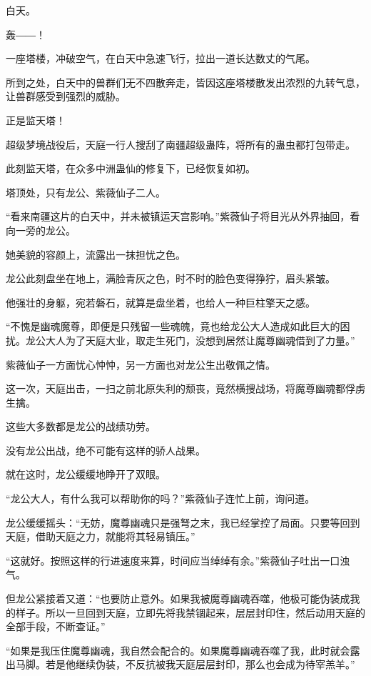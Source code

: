 
\begin{this_body}

白天。

轰――！

一座塔楼，冲破空气，在白天中急速飞行，拉出一道长达数丈的气尾。

所到之处，白天中的兽群们无不四散奔走，皆因这座塔楼散发出浓烈的九转气息，让兽群感受到强烈的威胁。

正是监天塔！

超级梦境战役后，天庭一行人搜刮了南疆超级蛊阵，将所有的蛊虫都打包带走。

此刻监天塔，在众多中洲蛊仙的修复下，已经恢复如初。

塔顶处，只有龙公、紫薇仙子二人。

“看来南疆这片的白天中，并未被镇运天宫影响。”紫薇仙子将目光从外界抽回，看向一旁的龙公。

她美貌的容颜上，流露出一抹担忧之色。

龙公此刻盘坐在地上，满脸青灰之色，时不时的脸色变得狰狞，眉头紧皱。

他强壮的身躯，宛若磐石，就算是盘坐着，也给人一种巨柱擎天之感。

“不愧是幽魂魔尊，即便是只残留一些魂魄，竟也给龙公大人造成如此巨大的困扰。龙公大人为了天庭大业，取走生死门，没想到居然让魔尊幽魂借到了力量。”

紫薇仙子一方面忧心忡忡，另一方面也对龙公生出敬佩之情。

这一次，天庭出击，一扫之前北原失利的颓丧，竟然横搜战场，将魔尊幽魂都俘虏生擒。

这些大多数都是龙公的战绩功劳。

没有龙公出战，绝不可能有这样的骄人战果。

就在这时，龙公缓缓地睁开了双眼。

“龙公大人，有什么我可以帮助你的吗？”紫薇仙子连忙上前，询问道。

龙公缓缓摇头：“无妨，魔尊幽魂只是强弩之末，我已经掌控了局面。只要等回到天庭，借助天庭之力，就能将其轻易镇压。”

“这就好。按照这样的行进速度来算，时间应当绰绰有余。”紫薇仙子吐出一口浊气。

但龙公紧接着又道：“也要防止意外。如果我被魔尊幽魂吞噬，他极可能伪装成我的样子。所以一旦回到天庭，立即先将我禁锢起来，层层封印住，然后动用天庭的全部手段，不断查证。”

“如果是我压住魔尊幽魂，我自然会配合的。如果魔尊幽魂吞噬了我，此时就会露出马脚。若是他继续伪装，不反抗被我天庭层层封印，那么也会成为待宰羔羊。”


\end{this_body}
